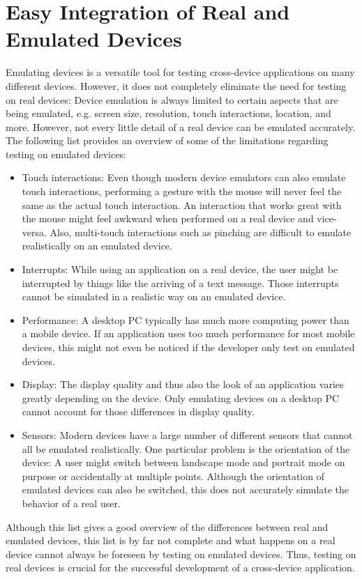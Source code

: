 \section{Easy Integration of Real and Emulated Devices}

Emulating devices is a versatile tool for testing cross-device applications on many different devices. However, it does not completely eliminate the need for testing on real devices: Device emulation is always limited to certain aspects that are being emulated, e.g. screen size, resolution, touch interactions, location, and more. However, not every little detail of a real device can be emulated accurately. The following list provides an overview of some of the limitations regarding testing on emulated devices:
\begin{itemize}
	\item Touch interactions: Even though modern device emulators can also emulate touch interactions, performing a gesture with the mouse will never feel the same as the actual touch interaction. An interaction that works great with the mouse might feel awkward when performed on a real device and vice-versa. Also, multi-touch interactions such as pinching are difficult to emulate realistically on an emulated device.
	\item Interrupts: While using an application on a real device, the user might be interrupted by things like the arriving of a text message. Those interrupts cannot be simulated in a realistic way on an emulated device.
	\item Performance: A desktop PC typically has much more computing power than a mobile device. If an application uses too much performance for most mobile devices, this might not even be noticed if the developer only test on emulated devices.
	\item Display: The display quality and thus also the look of an application varies greatly depending on the device. Only emulating devices on a desktop PC cannot account for those differences in display quality. 
	\item Sensors: Modern devices have a large number of different sensors that cannot all be emulated realistically. One particular problem is the orientation of the device: A user might switch between landscape mode and portrait mode on purpose or accidentally at multiple points. Although the orientation of emulated devices can also be switched, this does not accurately simulate the behavior of a real user.
\end{itemize}
Although this list gives a good overview of the differences between real and emulated devices, this list is by far not complete and what happens on a real device cannot always be foreseen by testing on emulated devices. Thus, testing on real devices is crucial for the successful development of a cross-device application. 

